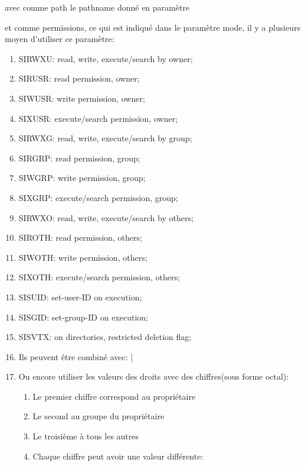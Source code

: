 \documentclass[a4paper]{article}
\begin{document}
\begin{description}
  \item avec comme path le pathname donné en paramètre
  \item et comme permissions, ce qui est indiqué dans le paramètre mode, il y a plusieurs moyen d'utiliser ce paramètre:
  \begin{enumerate}
    \item S\textunderscore{}IRWXU: read, write, execute/search by owner;
    \item S\textunderscore{}IRUSR: read permission, owner;
    \item S\textunderscore{}IWUSR: write permission, owner;
    \item S\textunderscore{}IXUSR: execute/search permission, owner;
    \item S\textunderscore{}IRWXG: read, write, execute/search by group;
    \item S\textunderscore{}IRGRP: read permission, group;
    \item S\textunderscore{}IWGRP: write permission, group;
    \item S\textunderscore{}IXGRP: execute/search permission, group;
    \item S\textunderscore{}IRWXO: read, write, execute/search by others;
    \item S\textunderscore{}IROTH: read permission, others;
    \item S\textunderscore{}IWOTH: write permission, others;
    \item S\textunderscore{}IXOTH: execute/search permission, others;
    \item S\textunderscore{}ISUID: set-user-ID on execution;
    \item S\textunderscore{}ISGID: set-group-ID on execution;
    \item S\textunderscore{}ISVTX: on directories, restricted deletion flag;
    \item Ils peuvent être combiné avec: \guillemotleft{}|\guillemotright{}
    \item Ou encore utiliser les valeurs des droits avec des chiffres(sous forme octal):
    \begin{enumerate}
      \item Le premier chiffre correspond au propriétaire
      \item Le second au groupe du propriétaire
      \item Le troisième à tous les autres \newline
      \item Chaque chiffre peut avoir une valeur différente:

\end{enumerate}
\end{enumerate}
\end{description}
\end{document}
